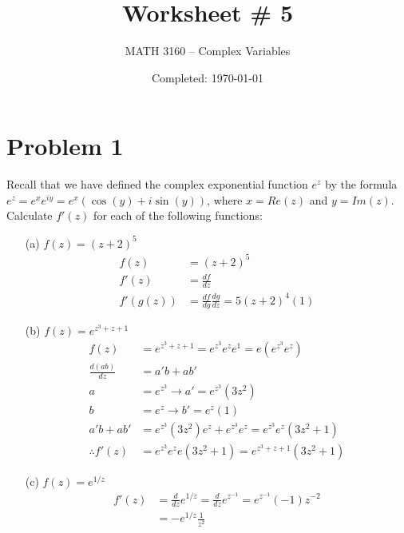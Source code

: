 \documentclass{article}
\title{Worksheet \# 5}
\author{
	MATH 3160 -- Complex Variables\\
	\myauthor
}
\date{Completed: \today}
\newcommand{\der}[2]{\frac{d#1}{d#2}}
\begin{document}
\maketitle %


\section*{Problem 1}
Recall that we have defined the complex exponential function $e^z$ by the formula $e^z = e^xe^{iy} = e^x(\cos{(y)} + i \sin{(y)})$, where $x = Re(z)$ and $y = Im(z)$.
\\

Calculate $f'(z)$ for each of the following functions:

\begin{enumerate}
	\item[(a)] $f (z) = (z + 2)^5$
		\begin{align*}
			f (z)    & = (z + 2)^5                           \\
			f'(z)    & = \der{f}{z}                          \\
			f'(g(z)) & = \der{f}{g}\der{g}{z} =  5(z+2)^4(1)
		\end{align*}
	\item[(b)] $f (z) = e^{z^3+z+1}$
		\begin{align*}
			f(z)             & = e^{z^3+z+1} = e^{z^3}e^{z}e^{1} = e(e^{z^3}e^{z})  \\
			\der{(ab)}{z}    & = a'b+ab'                                          \\
			a                & = e^{z^3} \to a' = e^{z^3}(3z^2)                    \\
			b                & = e^{z} \to b' = e^z(1)                             \\
			a'b+ab'          & = e^{z^3}(3z^2)e^z+e^{z^3}e^z = e^{z^3}e^z(3z^2 + 1) \\
			\therefore f'(z) & = e^{z^3}e^ze(3z^2 + 1) = e^{z^3+z+1}(3z^2 + 1)
		\end{align*}
	\item[(c)] $f (z) = e^{1/z}$
		\begin{align*}
			f'(z) & = \der{}{z}e^{1/z} = \der{}{z}e^{z^{-1}} = e^{z^{-1}}(-1)z^{-2} \\
			      & = -e^{1/z}\frac{1}{z^2}
		\end{align*}
\end{enumerate}
\end{document}
